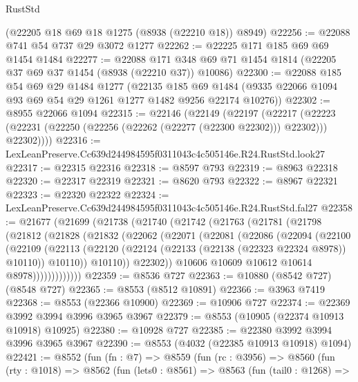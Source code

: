 \begin{lexlean}{RustStd}
\begin{coremodule}
    (@22205 @18 @69 @18 @1275 (@8938 (@22210 @18)) @8949)
@22256 := @22088 @741 @54 @737 @29 @3072 @1277
@22262 := @22225 @171 @185 @69 @69 @1454 @1484
@22277 := @22088
    @171
    @348
    @69
    @71
    @1454
    @1814
    (@22205 @37 @69 @37 @1454 (@8938 (@22210 @37)) @10086)
@22300 := @22088
    @185
    @54
    @69
    @29
    @1484
    @1277
    (@22135
      @185
      @69
      @1484
      (@9335 @22066 @1094 @93 @69 @54 @29 @1261 @1277 @1482 @9256 @22174 @10276))
@22302 := @8955 @22066 @1094
@22315 := @22146
    (@22149
      (@22197
        (@22217
          (@22223 (@22231 (@22250 (@22256 (@22262 (@22277 (@22300 @22302))) @22302))) @22302))))
@22316 := LexLeanPreserve.Cc639d244984595f0311043c4c505146e.R24.RustStd.look27
@22317 := @22315 @22316
@22318 := @8597 @793
@22319 := @8963 @22318
@22320 := @22317 @22319
@22321 := @8620 @793
@22322 := @8967 @22321
@22323 := @22320 @22322
@22324 := LexLeanPreserve.Cc639d244984595f0311043c4c505146e.R24.RustStd.fal27
@22358 := @21677
    (@21699
      (@21738
        (@21740
          (@21742
            (@21763
              (@21781
                (@21798
                  (@21812
                    (@21828
                      (@21832
                        (@22062
                          (@22071
                            (@22081
                              (@22086
                                (@22094
                                  (@22100
                                    (@22109
                                      (@22113
                                        (@22120
                                          (@22124 (@22133 (@22138 (@22323 @22324 @8978)) @10110))
                                          @10110))
                                      @10110))
                                  @22302))
                              @10606
                              @10609
                              @10612
                              @10614
                              @8978)))))))))))))
@22359 := @8536 @727
@22363 := @10880 (@8542 @727) (@8548 @727)
@22365 := @8553 (@8512 @10891)
@22366 := @3963 @7419
@22368 := @8553 (@22366 @10900)
@22369 := @10906 @727
@22374 := @22369 @3992 @3994 @3996 @3965 @3967
@22379 := @8553 (@10905 (@22374 @10913 @10918) @10925)
@22380 := @10928 @727
@22385 := @22380 @3992 @3994 @3996 @3965 @3967
@22390 := @8553 (@4032 (@22385 @10913 @10918) @1094)
@22421 := @8552
    (fun (fn : @7) =>
    @8559
      (fun (rc : @3956) =>
      @8560
        (fun (rty : @1018) =>
        @8562
          (fun (lets0 : @8561) =>
          @8563
            (fun (tail0 : @1268) =>

\end{coremodule}
\end{lexlean}

